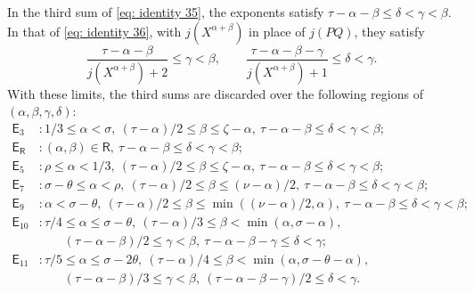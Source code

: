 \documentclass{article}
\numberwithin{equation}{section}
\newcommand{\Le}{\leqslant}
\begin{document}
In the third sum of \eqref{eq: identity 35}, the exponents satisfy $\tau - \alpha - \beta \Le \delta < \gamma < \beta$. In that of \eqref{eq: identity 36}, with $j(X^{\alpha + \beta})$ in place of $j(PQ)$, they satisfy
\begin{equation*}
\frac{\tau - \alpha - \beta}{j(X^{\alpha + \beta}) + 2} \Le \gamma < \beta, \qquad \frac{\tau - \alpha - \beta - \gamma}{j(X^{\alpha + \beta}) + 1} \Le \delta < \gamma.
\end{equation*}
With these limits, the third sums are discarded over the following regions of $(\alpha, \beta, \gamma, \delta)$:
\begin{equation}
\label{eq: four dim regions}
\begin{aligned}
\mathsf{E}_3 &: 1/3 \Le \alpha < \sigma,\ (\tau - \alpha)/2 \Le \beta \Le \zeta - \alpha,\ \tau - \alpha - \beta \Le \delta < \gamma < \beta; \\
\mathsf{E}_{\mathsf{R}} &: (\alpha, \beta) \in \mathsf{R},\ \tau - \alpha - \beta \Le \delta < \gamma < \beta; \\
\mathsf{E}_5 &: \rho \Le \alpha < 1/3,\ (\tau - \alpha)/2 \Le \beta \Le \zeta - \alpha,\ \tau - \alpha - \beta \Le \delta < \gamma < \beta; \\
\mathsf{E}_7 &: \sigma - \theta \Le \alpha < \rho,\ (\tau - \alpha)/2 \Le \beta \Le (\nu - \alpha)/2,\ \tau - \alpha - \beta \Le \delta < \gamma < \beta; \\
\mathsf{E}_9 &: \alpha < \sigma - \theta,\ (\tau - \alpha)/2 \Le \beta \Le \min((\nu - \alpha)/2, \alpha),\ \tau - \alpha - \beta \Le \delta < \gamma < \beta; \\
\mathsf{E}_{10} &: \tau/4 \Le \alpha \Le \sigma - \theta,\ (\tau - \alpha)/3 \Le \beta < \min(\alpha, \sigma - \alpha), \\
& \qquad (\tau - \alpha - \beta)/2 \Le \gamma < \beta,\ \tau - \alpha - \beta - \gamma \Le \delta < \gamma; \\
\mathsf{E}_{11} &: \tau/5 \Le \alpha \Le \sigma - 2\theta,\ (\tau - \alpha)/4 \Le \beta < \min(\alpha, \sigma - \theta - \alpha), \\
& \qquad (\tau - \alpha - \beta)/3 \Le \gamma < \beta,\ (\tau - \alpha - \beta - \gamma)/2 \Le \delta < \gamma.
\end{aligned}
\end{equation}
\end{document}
